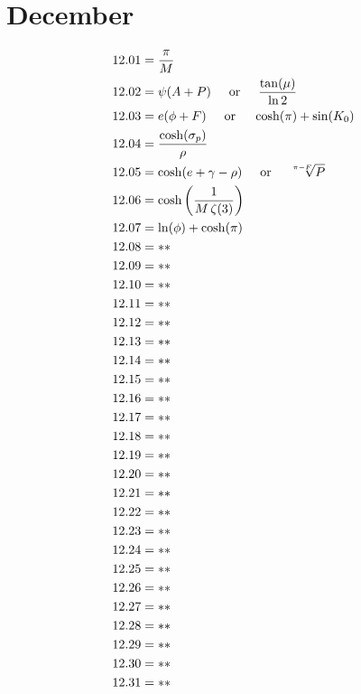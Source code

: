 \documentclass[12pt]{article}
\newcommand{\oder}{\hspace{5mm}\text{or}\hspace{5mm}}
\begin{document}
\pagebreak
 
\section{December}
\begin{align*}
12.01 &= \frac{\pi}{M}\\
12.02 &= \psi (A+P) \oder \frac{\tan(\mu)}{\ln 2}\\
12.03 &= e (\phi+F) \oder \cosh(\pi)+\sin(K_{0})\\
12.04 &= \frac{\cosh(\sigma_{p})}{\rho}\\
12.05 &= \cosh(e+\gamma-\rho) \oder \sqrt[\pi-F]{P}\\
12.06 &= \cosh\left(\frac{1}{M \, \zeta(3)}\right)\\
12.07 &= \ln(\phi)+\cosh(\pi)\\
12.08 &= **\\
12.09 &= **\\
12.10 &= **\\
12.11 &= **\\
12.12 &= **\\
12.13 &= **\\
12.14 &= **\\
12.15 &= **\\
12.16 &= **\\
12.17 &= **\\
12.18 &= **\\
12.19 &= **\\
12.20 &= **\\
12.21 &= **\\
12.22 &= **\\
12.23 &= **\\
12.24 &= **\\
12.25 &= **\\
12.26 &= **\\
12.27 &= **\\
12.28 &= **\\
12.29 &= **\\
12.30 &= **\\
12.31 &= **\\
\end{align*}
\end{document}
